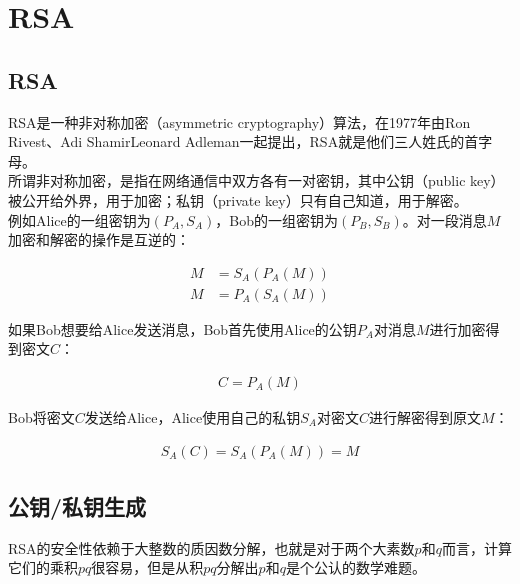 \newpage

\section{RSA}

\subsection{RSA}

RSA是一种非对称加密（asymmetric cryptography）算法，在1977年由Ron Rivest、Adi ShamirLeonard Adleman一起提出，RSA就是他们三人姓氏的首字母。\\

所谓非对称加密，是指在网络通信中双方各有一对密钥，其中公钥（public key）被公开给外界，用于加密；私钥（private key）只有自己知道，用于解密。\\

例如Alice的一组密钥为$ (P_A, S_A) $，Bob的一组密钥为$ (P_B, S_B) $。对一段消息$ M $加密和解密的操作是互逆的：

\vspace{-1cm}

\begin{align*}
    M & = S_A(P_A(M)) \\
    M & = P_A(S_A(M))
\end{align*}

如果Bob想要给Alice发送消息，Bob首先使用Alice的公钥$ P_A $对消息$ M $进行加密得到密文$ C $：

\vspace{-1cm}

\begin{align*}
    C = P_A(M)
\end{align*}

Bob将密文$ C $发送给Alice，Alice使用自己的私钥$ S_A $对密文$ C $进行解密得到原文$ M $：

\vspace{-1cm}

\begin{align*}
    S_A(C) = S_A(P_A(M)) = M
\end{align*}

\vspace{0.5cm}

\subsection{公钥/私钥生成}

RSA的安全性依赖于大整数的质因数分解，也就是对于两个大素数$ p $和$ q $而言，计算它们的乘积$ pq $很容易，但是从积$ pq $分解出$ p $和$ q $是个公认的数学难题。\\

